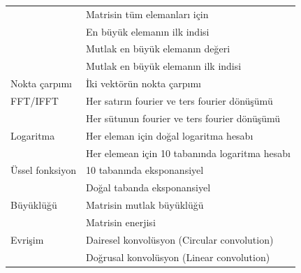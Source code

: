\begin{longtable}{p{80pt} p{250pt}}
 												& Matrisin tüm elemanları için																\\%
 												& En büyük elemanın ilk indisi																\\%
 												& Mutlak en büyük elemanın değeri															\\%
 												& Mutlak en büyük elemanın ilk indisi													\\%
 Nokta çarpımı					& İki vektörün nokta çarpımı																	\\%
 FFT/IFFT								& Her satırın fourier ve ters fourier dönüşümü								\\%
 												& Her sütunun fourier ve ters fourier dönüşümü								\\%
 Logaritma							& Her eleman için doğal logaritma hesabı											\\%
 												& Her elemean için 10 tabanında logaritma hesabı							\\%
 Üssel fonksiyon				& 10 tabanında eksponansiyel 																	\\%
 												& Doğal tabanda eksponansiyel 																\\%
 Büyüklüğü  						& Matrisin mutlak büyüklüğü																		\\%
 												& Matrisin enerjisi																						\\%
 Evrişim 								& Dairesel konvolüsyon (Circular convolution)									\\%
 												& Doğrusal konvolüsyon (Linear convolution) 									\\%

\end{longtable}
